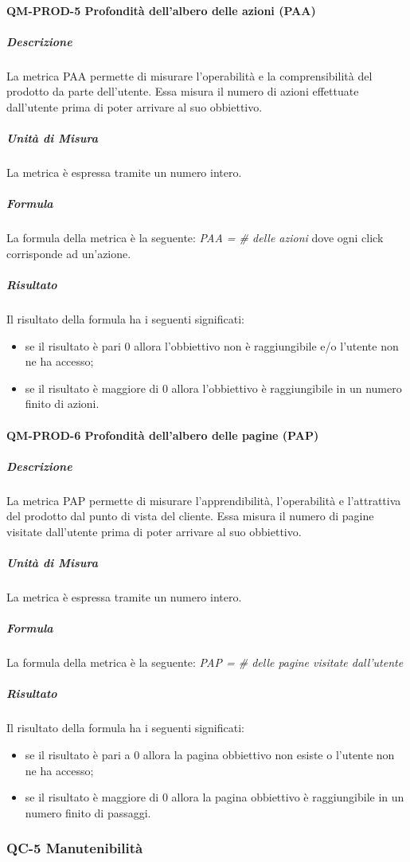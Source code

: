 		\paragraph{QM-PROD-5 Profondità dell'albero delle azioni (PAA)}
			\subparagraph{Descrizione}
				La metrica PAA permette di misurare l'operabilità e la comprensibilità del prodotto da parte dell'utente. Essa misura il numero di azioni effettuate dall'utente prima di poter arrivare al suo obbiettivo.
			\subparagraph{Unità di Misura}
				La metrica è espressa tramite un numero intero.
			\subparagraph{Formula}
				La formula della metrica è la seguente:
				\textit{PAA = \# delle azioni}
				dove ogni click corrisponde ad un'azione.
			\subparagraph{Risultato}
				Il risultato della formula ha i seguenti significati:
				\begin{itemize}
					\item se il risultato è pari 0 allora l'obbiettivo non è raggiungibile e/o l'utente non ne ha accesso;
					\item se il risultato è maggiore di 0 allora l'obbiettivo è raggiungibile in un numero finito di azioni.
				\end{itemize}
		\paragraph{QM-PROD-6 Profondità dell'albero delle pagine (PAP)}
			\subparagraph{Descrizione}
				La metrica PAP permette di misurare l'apprendibilità, l'operabilità e l'attrattiva del prodotto dal punto di vista del cliente. Essa misura il numero di pagine visitate dall'utente prima di poter arrivare al suo obbiettivo.
			\subparagraph{Unità di Misura}
				La metrica è espressa tramite un numero intero.
			\subparagraph{Formula}
				La formula della metrica è la seguente:
				\textit{PAP = \# delle pagine visitate dall'utente}
			\subparagraph{Risultato}
				Il risultato della formula ha i seguenti significati:
				\begin{itemize}
					\item se il risultato è pari a 0 allora la pagina obbiettivo non esiste o l'utente non ne ha accesso;
					\item se il risultato è maggiore di 0 allora la pagina obbiettivo è raggiungibile in un numero finito di passaggi.
				\end{itemize}

	\subsubsection{QC-5 Manutenibilità}
